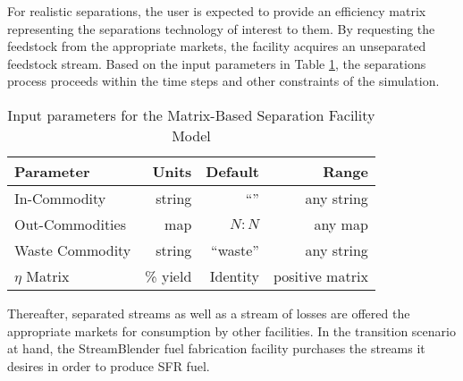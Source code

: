 For realistic separations, the user is expected to provide an efficiency 
matrix representing the separations technology of interest to them. 
By requesting the feedstock from the 
appropriate markets, the facility acquires an unseparated feedstock stream. 
Based on the input parameters  in Table \ref{tab:sepmatrix}, the separations 
process proceeds within the time steps and other constraints of the simulation. 

\begin{table}[h!]
\centering
\begin{tabular}{|l|r|r|r|}
\hline
\textbf{Parameter} & \textbf{Units} & \textbf{Default} & \textbf{Range}\\ 
\hline
In-Commodity & string &``'' & any string \\
Out-Commodities & map & $N:N$ & any map \\
Waste Commodity & string & ``waste'' & any string\\
$\eta$ Matrix & \% yield & Identity & positive matrix \\
\hline
\end{tabular}
\caption{Input parameters for the Matrix-Based Separation Facility Model}
\label{tab:sepmatrix}
\end{table}

Thereafter, separated streams as well as a stream of losses are offered the 
appropriate markets for consumption by other facilities. In the transition 
scenario at hand, the StreamBlender fuel fabrication facility purchases the 
streams it desires in order to produce \gls{SFR} fuel. 

